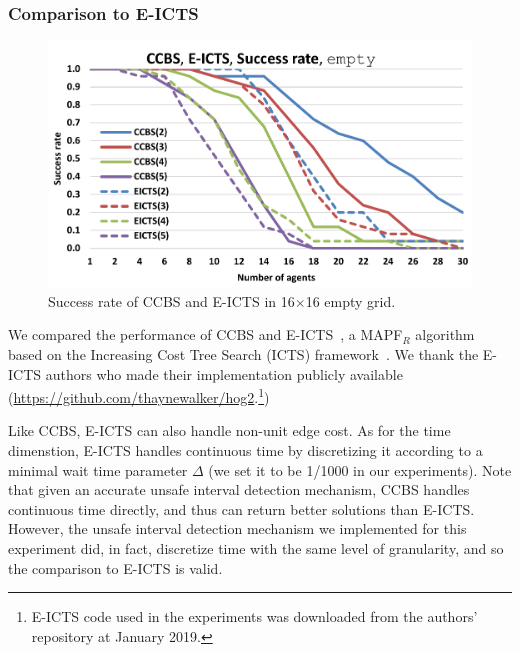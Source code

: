 \documentclass[review]{elsarticle}
\newcommand{\ccbs}{\ac{CCBS}\xspace}
\newcommand{\mapfr}{\ac{MAPF}$_R$\xspace}
\begin{document}
\subsubsection{Comparison to E-ICTS}


\begin{figure}
    \centering
    \includegraphics[width=0.75\columnwidth]{ccbs-eicts-sr-plot-empty_NEW.pdf}
    \caption{Success rate of \ccbs and E-ICTS in 16$\times$16 empty grid.}
    \label{fig:ccbs-vs-eicts}
    \vspace{-0.3cm}
\end{figure}


We compared the performance of \ccbs and E-ICTS~\cite{walker2018extended}, a \mapfr algorithm based on the Increasing Cost Tree Search (ICTS) framework~\cite{sharon2013increasing}. We thank the E-ICTS authors who made their implementation publicly available (\url{https://github.com/thaynewalker/hog2}.\footnote{E-ICTS code used in the experiments was downloaded from the authors' repository at January 2019.})

Like \ccbs, E-ICTS  can also handle non-unit edge cost. As for the time dimenstion, E-ICTS handles continuous time by discretizing it according to a minimal wait time parameter $\Delta$ (we set it to be 1/1000 in our experiments). Note that given an accurate unsafe interval detection mechanism, \ccbs handles continuous time directly, and thus can return better solutions than E-ICTS. However, the unsafe interval detection mechanism we implemented for this experiment did, in fact, discretize time with the same level of granularity, and so the comparison to E-ICTS is valid. 
\end{document}
